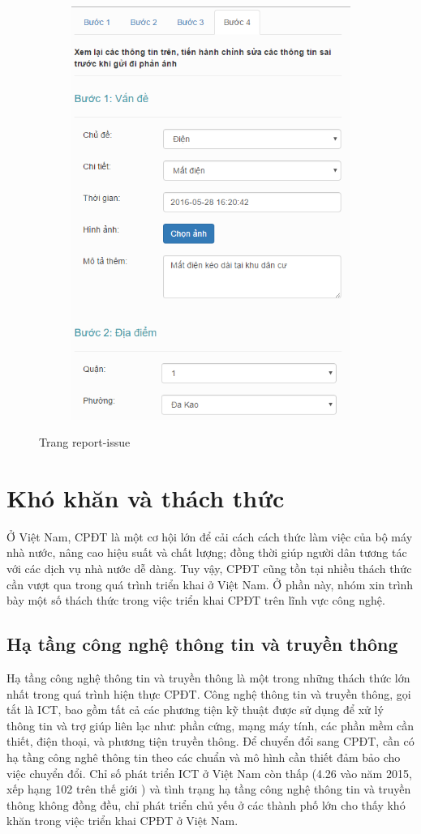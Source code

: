 \documentclass[a4paper]{article}
\begin{document}
\begin{itemize}
\begin{figure}[h]
\begin{subfigure}{.5\textwidth}
  			\includegraphics[width=0.6\linewidth]{Step4.PNG}
  			\caption{}
  			\label{fig:sub2}
		\end{subfigure}
		\caption{Trang report-issue}
	\end{figure}
\end{itemize}


    

    

    

	\newpage
	

\section{Khó khăn và thách thức}
Ở Việt Nam, CPĐT là một cơ hội lớn để cải cách cách thức làm việc của bộ máy nhà nước, nâng cao hiệu suất và chất lượng; đồng thời giúp người dân tương tác với các dịch vụ nhà nước dễ dàng. Tuy vậy, CPĐT cũng tồn tại nhiều thách thức cần vượt qua trong quá trình triển khai ở Việt Nam. Ở phần này, nhóm xin trình bày một số thách thức trong việc triển khai CPĐT trên lĩnh vực công nghệ.
\subsection{Hạ tầng công nghệ thông tin và truyền thông}
Hạ tầng công nghệ thông tin và truyền thông là một trong những thách thức lớn nhất trong quá trình hiện thực CPĐT. Công nghệ thông tin và truyền thông, gọi tắt là ICT, bao gồm tất cả các phương tiện kỹ thuật được sử dụng để xử lý thông tin và trợ giúp liên lạc như: phần cứng, mạng máy tính, các phần mềm cần thiết, điện thoại, và phương tiện truyền thông. Để chuyển đổi sang CPĐT, cần có hạ tầng công nghê thông tin theo các chuẩn và mô hình cần thiết đảm bảo cho việc chuyển đổi. Chỉ số phát triển ICT ở Việt Nam còn thấp (4.26 vào năm 2015, xếp hạng 102 trên thế giới \cite{bib9}) và tình trạng hạ tầng công nghệ thông tin và truyền thông không đồng đều, chỉ phát triển chủ yếu ở các thành phố lớn cho thấy khó khăn trong việc triển khai CPĐT ở Việt Nam.
\end{document}
